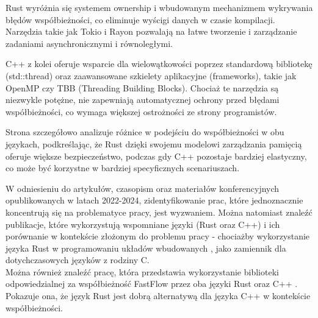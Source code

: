 Rust wyróżnia się systemem ownership i wbudowanym mechanizmem wykrywania błędów współbieżności, co eliminuje wyścigi danych w czasie kompilacji. Narzędzia takie jak Tokio i Rayon pozwalają na łatwe tworzenie i zarządzanie zadaniami asynchronicznymi i równoległymi.

C++ z kolei oferuje wsparcie dla wielowątkowości poprzez standardową bibliotekę (std::thread) oraz zaawansowane szkielety aplikacyjne (frameworks), takie jak OpenMP czy TBB (Threading Building Blocks). Chociaż te narzędzia są niezwykle potężne, nie zapewniają automatycznej ochrony przed błędami współbieżności, co wymaga większej ostrożności ze strony programistów.

Strona \cite{parallelrustcppIntroductionComparing} szczegółowo analizuje różnice w podejściu do współbieżności w obu językach, podkreślając, że Rust dzięki swojemu modelowi zarządzania pamięcią oferuje większe bezpieczeństwo, podczas gdy C++ pozostaje bardziej elastyczny, co może być korzystne w bardziej specyficznych scenariuszach.

W odniesieniu do artykułów, czasopism oraz materiałów konferencyjnych opublikowanych w latach 2022-2024, zidentyfikowanie prac, które jednoznacznie koncentrują się na problematyce pracy, jest wyzwaniem. Można natomiast znaleźć publikacje, które wykorzystują wspomniane języki (Rust oraz C++) i ich porównanie w kontekście złożonym do problemu pracy - chociażby wykorzystanie języka Rust w programowaniu układów wbudowanych \cite{ZamiennikWEmbedded}, jako zamiennik dla dotychczasowych języków z rodziny C.\\
Można również znaleźć pracę, która przedstawia wykorzystanie biblioteki odpowiedzialnej za współbieżność FastFlow przez oba języki Rust oraz C++ \cite{FastFlow}. Pokazuje ona, że język Rust jest dobrą alternatywą dla języka C++ w kontekście współbieżności.
